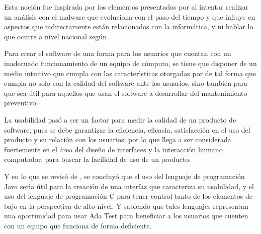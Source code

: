 Esta noci\'on fue inspirada por los elementos presentados por
\textcite{Aboaoja2022} al intentar realizar un an\'alisis con el malware que
evoluciona con el paso del tiempo y que influye en aspectos que indirectamente
est\'an relacionados con la inform\'atica, y ni hablar lo que ocurre a nivel
nacional seg\'un \textcite{CanoMartinez2022}.

Para crear el software de una forma para los usuarios que cuentan con un
inadecuado funcionamiento de un equipo de c\'omputo, se tiene que disponer de un
medio intuitivo que cumpla con las caracter\'{\i}sticas otorgadas por
\textcite{Mena2022} de tal forma que cumpla no solo con la calidad del software
ante los usuarios, sino tambi\'en para que sea \'util para aquellos que usan el
software a desarrollar del mantenimiento preventivo:

\begin{displayquote}
	La usabilidad pas\'o a ser un factor para medir la calidad de un producto de
	software, pues se debe garantizar la eficiencia, eficacia, satisfacci\'on en el
	uso del producto y su relaci\'on con los usuarios; por lo que llega a ser
	considerada fuertemente en el \'area del dise\~no de interfaces y la interacci\'on
	humano computador, para buscar la facilidad de uso de un producto.
\end{displayquote}

Y en lo que se revis\'o de \textcite{Trejos2023}, se concluy\'o que el uso del
lenguaje de programaci\'on Java ser\'{\i}a \'util para la creaci\'on de una interfaz que
caracteriza su usabilidad, y el uso del lenguaje de programaci\'on C para tener
control tanto de los elementos de bajo en la perspectiva de alto nivel. Y
sabiendo que tales lenguajes representan una oportunidad para usar Ada Test para
beneficiar a los usuarios que cuenten con un equipo que funciona de forma
deficiente.
